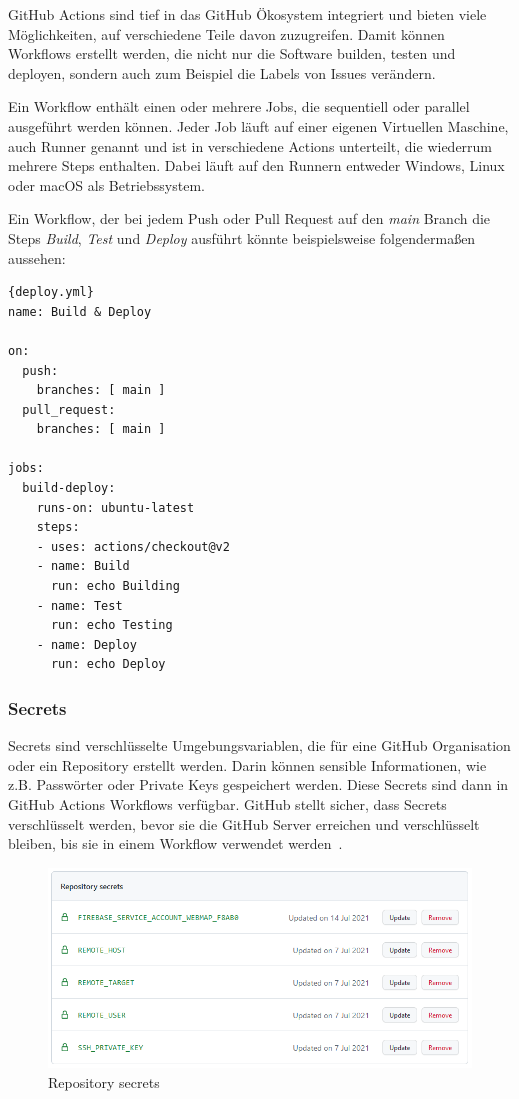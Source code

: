 GitHub Actions sind tief in das GitHub Ökosystem integriert und bieten viele Möglichkeiten,
auf verschiedene Teile davon zuzugreifen.
 Damit können Workflows erstellt werden, die nicht nur die Software builden, testen und deployen, sondern auch
 zum Beispiel die Labels von Issues verändern.

Ein Workflow enthält einen oder mehrere Jobs, die sequentiell oder parallel ausgeführt werden
können.
 Jeder Job läuft auf einer eigenen Virtuellen Maschine, auch Runner genannt und ist in
verschiedene Actions unterteilt, die wiederrum mehrere Steps enthalten.
 Dabei läuft
auf den Runnern entweder Windows, Linux oder macOS als Betriebssystem.

Ein Workflow, der bei jedem Push oder Pull Request auf den \textit{main} Branch die Steps
\textit{Build}, \textit{Test} und \textit{Deploy} ausführt könnte beispielsweise folgendermaßen
aussehen: ~\cite{github-actions}

\begin{lstlisting}[label={lst:deploy.yml}]{deploy.yml}
name: Build & Deploy

on:
  push:
    branches: [ main ]
  pull_request:
    branches: [ main ]

jobs:
  build-deploy:
    runs-on: ubuntu-latest
    steps:
    - uses: actions/checkout@v2
    - name: Build
      run: echo Building
    - name: Test
      run: echo Testing
    - name: Deploy
      run: echo Deploy
\end{lstlisting}

\subsubsection{Secrets}
Secrets sind verschlüsselte Umgebungsvariablen, die für eine GitHub Organisation oder ein
Repository erstellt werden.
Darin können sensible Informationen, wie z.B. Passwörter oder Private Keys gespeichert werden.
Diese Secrets sind dann in GitHub Actions Workflows verfügbar.
GitHub stellt sicher, dass Secrets verschlüsselt werden, bevor sie die GitHub Server erreichen
und verschlüsselt bleiben, bis sie in einem Workflow verwendet werden~\cite{github-secrets}.

\begin{figure}[hbt!]
    \centering
    \includegraphics[scale=0.5]{pics/secrets.png}
    \caption{Repository secrets}
\end{figure}

